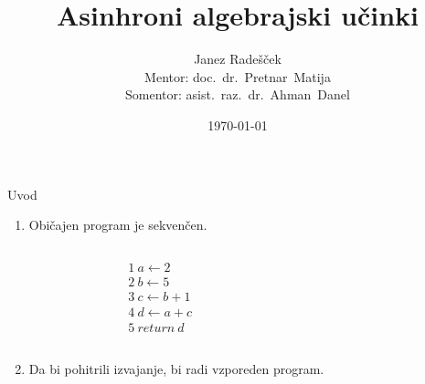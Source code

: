 \documentclass{beamer}
\theoremstyle{definition} %
\theoremstyle{plain} %
\begin{document}
	
	\title{Asinhroni algebrajski učinki}
	\author[Janez Radešček]{Janez Radešček \\[3mm] Mentor: doc.~dr.~Pretnar~Matija\\[3mm] Somentor: asist.~raz.~dr.~Ahman~Danel}
	\date{\today}
	
	\frame{\titlepage}

	
	
	\begin{frame}[fragile]{Uvod}
		\begin{enumerate}
			\item Običajen program je sekvenčen. 
			
			\begin{columns}[T]
				\begin{column}{0.2\textwidth}
					\begin{align*}
					&1\ a \gets 2  \\
					&2\ b \gets 5 \\
					&3\ c \gets b + 1 \\
					&4\ d \gets a + c \\
					&5\ return\ d 
					\end{align*}
					\vspace{0.1ex}
				\end{column}
				\begin{column}{0.5\textwidth}
				\end{column}
			\end{columns}
		
			\item Da bi pohitrili izvajanje, bi radi vzporeden program.

		\end{enumerate}	
	\end{frame}
\end{document}
